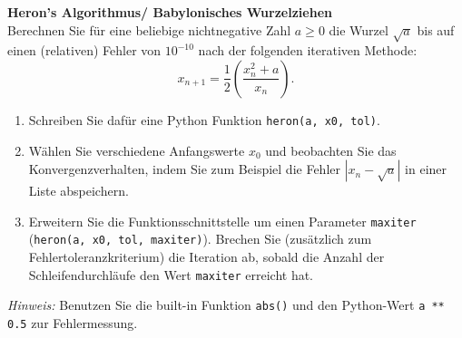 \textbf{Heron's Algorithmus/ Babylonisches Wurzelziehen}\\
Berechnen Sie für eine beliebige nichtnegative Zahl $a\ge 0$ die Wurzel $\sqrt{a}$ bis auf einen (relativen) Fehler von $10^{-10}$ nach der folgenden iterativen Methode:
$$ x_{n+1}=\frac{1}{2} \left(\frac{x_n^2+a}{x_n}\right) \nonumber.$$ 
\begin{enumerate}
	\item Schreiben Sie dafür eine Python Funktion \texttt{heron(a, x0, tol)}.
	\item Wählen Sie verschiedene Anfangswerte $x_0$ und beobachten Sie das Konvergenzverhalten, indem Sie zum Beispiel die Fehler $|x_n-\sqrt{a}|$ in einer Liste abspeichern.
	\item Erweitern Sie die Funktionsschnittstelle um einen Parameter \texttt{maxiter} (\texttt{heron(a, x0, tol, maxiter)}). Brechen Sie (zusätzlich zum Fehlertoleranzkriterium) die Iteration ab, sobald die Anzahl der Schleifendurchläufe den Wert \texttt{maxiter} erreicht hat.
\end{enumerate}

\textit{Hinweis:} Benutzen Sie die built-in Funktion \texttt{abs()} und den Python-Wert \texttt{a ** 0.5} zur Fehlermessung. 
